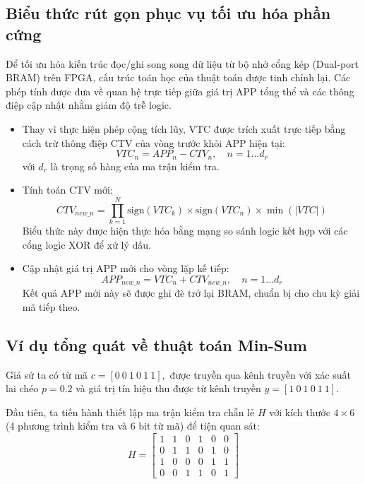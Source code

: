 \documentclass[12pt,a4paper,oneside]{book}
\begin{document}
\subsection{Biểu thức rút gọn phục vụ tối ưu hóa phần cứng}
Để tối ưu hóa kiến trúc đọc/ghi song song dữ liệu từ bộ nhớ cổng kép (Dual-port BRAM) trên FPGA, cấu trúc toán học của thuật toán được tinh chỉnh lại. Các phép tính được đưa về quan hệ trực tiếp giữa giá trị APP tổng thể và các thông điệp cập nhật nhằm giảm độ trễ logic.  
\begin{itemize}
    \item Thay vì thực hiện phép cộng tích lũy, VTC được trích xuất trực tiếp bằng cách trừ thông điệp CTV của vòng trước khỏi APP hiện tại:
    \begin{equation}
        VTC_n=APP_n-CTV_n, \quad n=1...d_r
        \label{eq:2}
    \end{equation}
    với $d_r$ là trọng số hàng của ma trận kiểm tra.  
    \item Tính toán CTV mới:
    \begin{equation}
        CTV_{new\_n}=\prod_{k=1}^{N}\text{sign}(VTC_k)\times\text{sign}(VTC_n)\times\min(\vert{}VTC\vert{})
        \label{eq:3}
    \end{equation}
    Biểu thức này được hiện thực hóa bằng mạng so sánh logic kết hợp với các cổng logic XOR để xử lý dấu. 
    \item Cập nhật giá trị APP mới cho vòng lặp kế tiếp:
    \begin{equation}
        APP_{new\_n}=VTC_n+CTV_{new\_n}, \quad n=1...d_r
        \label{eq:4}
    \end{equation}
    Kết quả APP mới này sẽ được ghi đè trở lại BRAM, chuẩn bị cho chu kỳ giải mã tiếp theo.  
\end{itemize}
\subsection{Ví dụ tổng quát về thuật toán Min-Sum}
Giả sử ta có từ mã $c = [0\ 0\ 1\ 0\ 1\ 1],$ được truyền qua kênh truyền với xác suất lai chéo $p=0.2$ và giá trị tín hiệu thu được từ kênh truyền $y = [1\ 0\ 1\ 0\ 1\ 1]$. \cite{8}

Đầu tiên, ta tiến hành thiết lập ma trận kiểm tra chẵn lẻ $H$ với kích thước $4\times 6$ (4 phương trình kiểm tra và 6 bit từ mã) để tiện quan sát:
\begin{equation}
    H = \begin{bmatrix} 1 & 1 & 0 & 1 & 0 & 0 \\ 0 & 1 & 1 & 0 & 1 & 0 \\ 1 & 0 & 0 & 0 & 1 & 1 \\ 0 & 0 & 1 & 1 & 0 & 1\end{bmatrix}
\end{equation}
\end{document}
